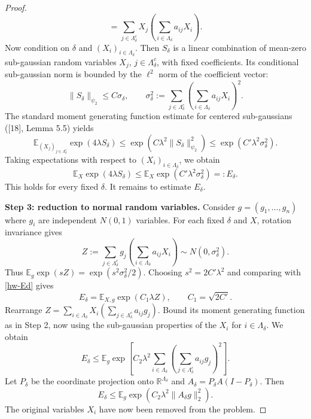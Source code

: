 \documentclass[UTF8,11pt]{ctexart}
\theoremstyle{definition}
\begin{document}
\begin{proof}
\[=\sum_{j\in\Lambda_\delta^c}X_j\left(\sum_{i\in\Lambda_\delta}a_{ij}X_i\right).
\]
Now condition on $\delta$ and $(X_i)_{i\in\Lambda_\delta}$. Then $S_\delta$
is a linear combination of mean-zero sub-gaussian random variables
$X_j$, $j\in\Lambda_\delta^c$, with fixed coefficients. Its conditional
sub-gaussian norm is bounded by the $\ell^2$ norm of the coefficient vector:
\[
\|S_\delta\|_{\psi_2}\leq C\sigma_\delta,\qquad
\sigma_\delta^2:=\sum_{j\in\Lambda_\delta^c}
\left(\sum_{i\in\Lambda_\delta}a_{ij}X_i\right)^2.
\]
The standard moment generating function estimate for centered sub-gaussians
([18], Lemma 5.5) yields
\[
\mathbb E_{(X_j)_{j\in\Lambda_\delta^c}}\exp(4\lambda S_\delta)
\leq\exp(C\lambda^2\|S_\delta\|_{\psi_2}^2)
\leq\exp(C'\lambda^2\sigma_\delta^2).
\]
Taking expectations with respect to $(X_i)_{i\in\Lambda_\delta}$, we obtain
\begin{equation}\label{hw-Ed}
\mathbb E_X\exp(4\lambda S_\delta)
\leq\mathbb E_X\exp(C'\lambda^2\sigma_\delta^2)=:E_\delta.
\end{equation}
This holds for every fixed $\delta$. It remains to estimate $E_\delta$.

\textbf{Step 3: reduction to normal random variables.}
Consider $g=(g_1,\ldots,g_n)$ where $g_i$ are independent $N(0,1)$ variables.
For each fixed $\delta$ and $X$, rotation invariance gives
\[
Z:=\sum_{j\in\Lambda_\delta^c}g_j
\left(\sum_{i\in\Lambda_\delta}a_{ij}X_i\right)
\sim N(0,\sigma_\delta^2).
\]
Thus $\mathbb E_g\exp(sZ)=\exp(s^2\sigma_\delta^2/2)$.
Choosing $s^2=2C'\lambda^2$ and comparing with \eqref{hw-Ed} gives
\[
E_\delta=\mathbb E_{X,g}\exp(C_1\lambda Z),\qquad C_1=\sqrt{2C'}.
\]
Rearrange $Z=\sum_{i\in\Lambda_\delta}X_i
(\sum_{j\in\Lambda_\delta^c}a_{ij}g_j)$.
Bound its moment generating function as in Step 2, now using the
sub-gaussian properties of the $X_i$ for $i\in\Lambda_\delta$. We obtain
\[
E_\delta\leq\mathbb E_g\exp\left[C_2\lambda^2
\sum_{i\in\Lambda_\delta}\left(\sum_{j\in\Lambda_\delta^c}a_{ij}g_j\right)^2\right].
\]
Let $P_\delta$ be the coordinate projection onto $\mathbb R^{\Lambda_\delta}$
and $A_\delta=P_\delta A(I-P_\delta)$. Then
\[
E_\delta\leq\mathbb E_g\exp(C_2\lambda^2\|A_\delta g\|_2^2).
\]
The original variables $X_i$ have now been removed from the problem.


\end{proof}
\end{document}
